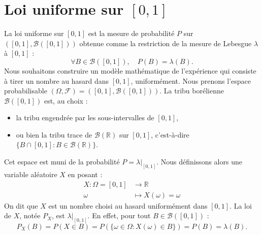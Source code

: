 \section{Loi uniforme sur $[0,1]$}
La loi uniforme sur $[0,1]$ est la mesure de probabilité $P$ sur $([0,1], \mathcal{B}([0,1]))$ obtenue comme la restriction de la mesure de Lebesgue $\lambda$ à $[0,1]$ :
\[
\forall B \in \mathcal{B}([0,1]), \quad P(B) = \lambda(B).
\]
Nous souhaitons construire un modèle mathématique de l'expérience qui consiste à tirer un nombre au hasard dans $[0,1]$, uniformément.
Nous prenons l'espace probabilisable $(\Omega, \mathcal{F}) = ([0,1], \mathcal{B}([0,1]))$. La tribu borélienne $\mathcal{B}([0,1])$ est, au choix :
\begin{itemize}
    \item la tribu engendrée par les sous-intervalles de $[0,1]$,
    \item ou bien la tribu trace de $\mathcal{B}(\mathbb{R})$ sur $[0,1]$, c'est-à-dire $\{B \cap [0,1] : B \in \mathcal{B}(\mathbb{R})\}$.
\end{itemize}
Cet espace est muni de la probabilité $P = \lambda|_{[0,1]}$.
Nous définissons alors une variable aléatoire $X$ en posant :
\begin{align*}
    X: \Omega = [0,1] &\to \mathbb{R} \\
    \omega &\mapsto X(\omega) = \omega
\end{align*}
On dit que $X$ est un nombre choisi au hasard uniformément dans $[0,1]$.
La loi de $X$, notée $P_X$, est $\lambda|_{[0,1]}$. En effet, pour tout $B \in \mathcal{B}([0,1])$ :
\[
P_X(B) = P(X \in B) = P(\{\omega \in \Omega : X(\omega) \in B\}) = P(B) = \lambda(B).
\]
